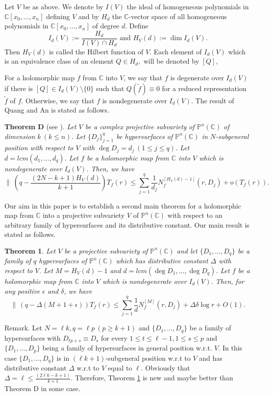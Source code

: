 \documentclass[12pt]{amsart}
\newtheorem{theorem}{Theorem}[section]
\newcommand{\C}{{\mathbb{C}}}
\renewcommand{\P}{{\mathbb{P}}}
\begin{document}
Let $V$ be as above. We denote by $I(V)$ the ideal of homogeneous polynomials in $\C[x_0,\ldots,x_n]$ defining $V$ and by $H_d$ the $\mathbb C$-vector space of all homogeneous polynomials in $\mathbb C [x_0,...,x_n]$ of degree $d.$  Define 
$$I_d(V):=\dfrac{H_d}{I(V)\cap H_d}\text{ and }H_V(d):=\dim I_d(V).$$
Then $H_V(d)$ is called the Hilbert function of $V$. Each element of $I_d(V)$ which is an equivalence class of an element $Q\in H_d,$ will be denoted by $[Q]$, 

For a holomorphic map $f$ from $\C$ into $V$, we say that $f$ is degenerate over $I_d(V)$ if there is $[Q]\in I_d(V)\setminus \{0\}$ such that $Q(\tilde f)\equiv 0$ for a reduced representation $\tilde f$ of $f$. Otherwise, we say that $f$ is nondegenerate over $I_d(V)$. The result of Quang and An is stated as follows.

\vskip0.2cm
\noindent
{\bf Theorem D} (see \cite[Theorem 1.1]{QA}). {\it Let $V$ be a complex projective subvariety of $\P^n(\C)$ of dimension $k\ (k\le n)$. Let $\{D_j\}_{j=1}^q$ be hypersurfaces of $\P^n(\C)$ in $N$-subgeneral position with respect to $V$ with $\deg D_j=d_j\ (1\le j\le q)$. Let $d=lcm (d_1,...,d_q)$. Let $f$ be a holomorphic map from $\C$ into $V$ which is nondegenerate over $I_d(V)$. Then, we have
$$\biggl \|\ \left(q-\dfrac{(2N-k+1)H_{V}(d)}{k+1}\right )T_f(r)\le \sum_{j=1}^{q}\dfrac{1}{d_j}N^{[H_{V}(d)-1]}_{f}(r,D_j)+o(T_f(r)).$$}

Our aim in this paper is to establish a second main theorem for a holomorphic map from $\C$ into a projective subvariety $V$ of $\P^n(\C)$ with respect to an arbitrary family of hypersurfaces and its distributive constant. Our main result is stated as follows.

\begin{theorem}\label{1.1}
Let $V$ be a projective subvariety of $\P^n(\C)$ and let $\{D_1,\ldots,D_q\}$ be a family of $q$ hypersurfaces of $\P^n(\C)$ which has distributive constant $\Delta$ with respect to $V$. Let $M=H_V(d)-1$ and $d=lcm(\deg D_1,\ldots,\deg D_q)$. Let $f$ be a holomorphic map from $\C$ into $V$ which is nondegenerate over $I_d(V)$. Then, for any positive $\epsilon$ and $\delta$, we have
$$\|\,(q-\Delta(M+1+\epsilon))T_f(r)\le\sum_{j=1}^q\frac{1}{d}N^{[M]}_f(r,D_j)+\Delta\delta \log r + O(1).$$
\end{theorem}

Remark. Let $N=\ell k, q=\ell p\ (p\ge k+1)$ and $\{D_1,\ldots,D_q\}$ be a family of hypersurfaces with $D_{tp+s}\equiv D_{s}$ for every $1\le t\le\ell-1,1\le s\le p$ and $\{D_1,\ldots,D_p\}$ being a family of hypersurfaces in general position w.r.t. $V$. In this case $\{D_1,\ldots,D_q\}$ is in $(\ell k+1)$-subgeneral position w.r.t to $V$ and has distributive constant $\Delta$ w.r.t to $V$ equal to $\ell$. Obviously that $\Delta=\ell\le \frac{(2\ell k-k+1)}{k+1}$. Therefore, Theorem \ref{1.1} is new and maybe better than Theorem D in some case. 
\end{document}
